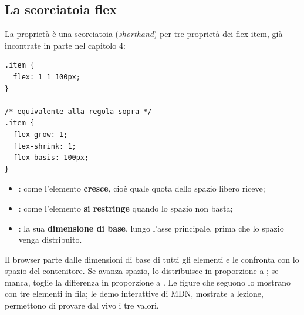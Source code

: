\subsection{La scorciatoia flex}

La proprietà  è una scorciatoia (\textit{shorthand}) per tre
proprietà dei flex item, già incontrate in parte nel capitolo 4:

\begin{affianco}[0.42][c]
\begin{lstlisting}[style=css, name=flex.css]
.item {
  flex: 1 1 100px;
}

/* equivalente alla regola sopra */
.item {
  flex-grow: 1;
  flex-shrink: 1;
  flex-basis: 100px;
}
\end{lstlisting}
\risultato
\begin{itemize}
  \item {}: come l'elemento \textbf{cresce}, cioè quale quota
        dello spazio libero riceve;
  \item {}: come l'elemento \textbf{si restringe} quando lo
        spazio non basta;
  \item {}: la sua \textbf{dimensione di base}, lungo l'asse
        principale, prima che lo spazio venga distribuito.
\end{itemize}
\end{affianco}

Il browser parte dalle dimensioni di base di tutti gli elementi e le confronta
con lo spazio del contenitore. Se avanza spazio, lo distribuisce in proporzione
a ; se manca, toglie la differenza in proporzione a
. Le figure che seguono lo mostrano con tre elementi in fila;
le demo interattive di MDN, mostrate a lezione, permettono di provare dal vivo
i tre valori.

